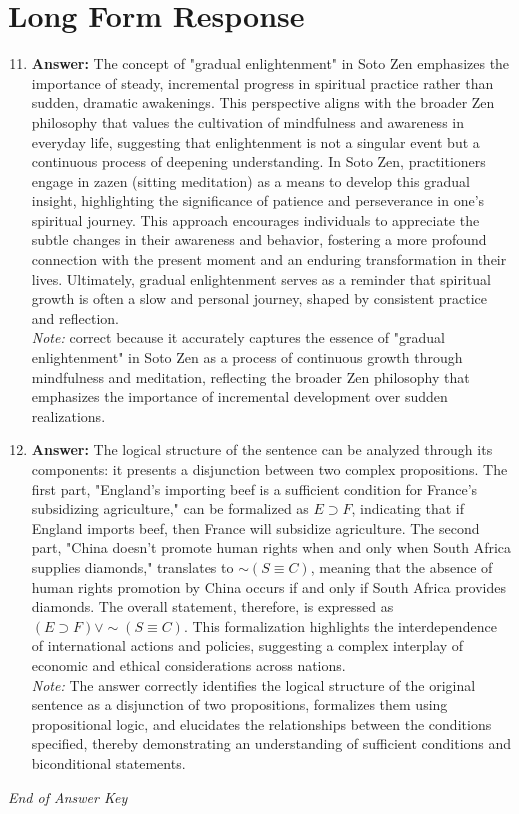 \documentclass[12pt]{article}
\begin{document}
\section*{Long Form Response}
\begin{enumerate}[label=\arabic*.]
\setcounter{enumi}{10}
\item \textbf{Answer:} The concept of "gradual enlightenment" in Soto Zen emphasizes the importance of steady, incremental progress in spiritual practice rather than sudden, dramatic awakenings. This perspective aligns with the broader Zen philosophy that values the cultivation of mindfulness and awareness in everyday life, suggesting that enlightenment is not a singular event but a continuous process of deepening understanding. In Soto Zen, practitioners engage in zazen (sitting meditation) as a means to develop this gradual insight, highlighting the significance of patience and perseverance in one's spiritual journey. This approach encourages individuals to appreciate the subtle changes in their awareness and behavior, fostering a more profound connection with the present moment and an enduring transformation in their lives. Ultimately, gradual enlightenment serves as a reminder that spiritual growth is often a slow and personal journey, shaped by consistent practice and reflection.
\\ \textit{Note:} correct because it accurately captures the essence of "gradual enlightenment" in Soto Zen as a process of continuous growth through mindfulness and meditation, reflecting the broader Zen philosophy that emphasizes the importance of incremental development over sudden realizations.
\item \textbf{Answer:} The logical structure of the sentence can be analyzed through its components: it presents a disjunction between two complex propositions. The first part, "England's importing beef is a sufficient condition for France's subsidizing agriculture," can be formalized as \( E \supset F \), indicating that if England imports beef, then France will subsidize agriculture. The second part, "China doesn't promote human rights when and only when South Africa supplies diamonds," translates to \( \sim(S \equiv C) \), meaning that the absence of human rights promotion by China occurs if and only if South Africa provides diamonds. The overall statement, therefore, is expressed as \( (E \supset F) \lor \sim(S \equiv C) \). This formalization highlights the interdependence of international actions and policies, suggesting a complex interplay of economic and ethical considerations across nations.
\\ \textit{Note:} The answer correctly identifies the logical structure of the original sentence as a disjunction of two propositions, formalizes them using propositional logic, and elucidates the relationships between the conditions specified, thereby demonstrating an understanding of sufficient conditions and biconditional statements.
\end{enumerate}

\vfill
\noindent\textit{End of Answer Key}
\end{document}

